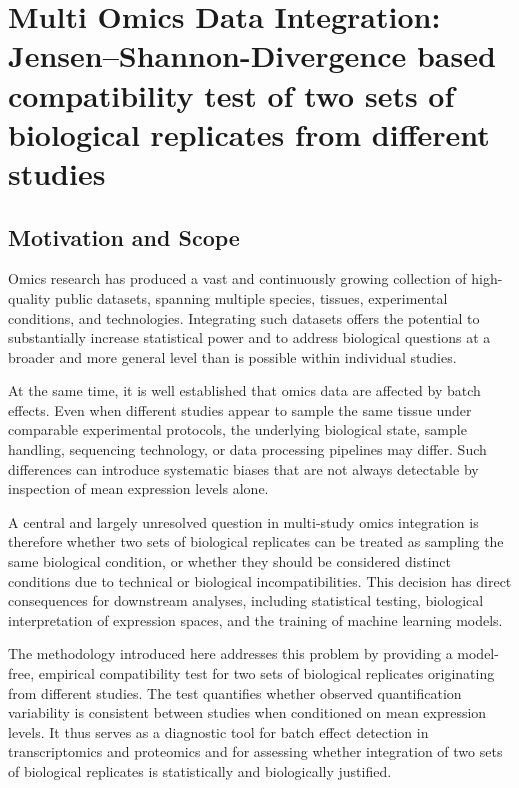 \section{Multi Omics Data Integration: Jensen--Shannon-Divergence based compatibility test of two sets of biological replicates from different studies}

\label{sec:jsd_comp_test}

\subsection{Motivation and Scope}

Omics research has produced a vast and continuously growing collection of high-quality public datasets, spanning multiple species, tissues, experimental conditions, and technologies. Integrating such datasets offers the potential to substantially increase statistical power and to address biological questions at a broader and more general level than is possible within individual studies.

At the same time, it is well established that omics data are affected by batch effects. Even when different studies appear to sample the same tissue under comparable experimental protocols, the underlying biological state, sample handling, sequencing technology, or data processing pipelines may differ. Such differences can introduce systematic biases that are not always detectable by inspection of mean expression levels alone.

A central and largely unresolved question in multi-study omics integration is therefore whether two sets of biological replicates can be treated as sampling the same biological condition, or whether they should be considered distinct conditions due to technical or biological incompatibilities. This decision has direct consequences for downstream analyses, including statistical testing, biological interpretation of expression spaces, and the training of machine learning models.

The methodology introduced here addresses this problem by providing a model-free, empirical compatibility test for two sets of biological replicates originating from different studies. The test quantifies whether observed quantification variability is consistent between studies when conditioned on mean expression levels. It thus serves as a diagnostic tool for batch effect detection in transcriptomics and proteomics and for assessing whether integration of two sets of biological replicates is statistically and biologically justified.

